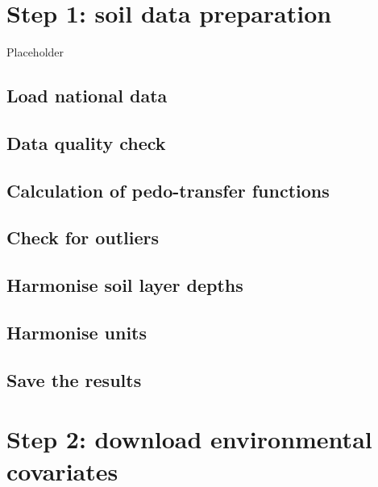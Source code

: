 \documentclass[
  10pt,
  b5paper,
  oneside]{book}
\begin{document}
\hypertarget{step-1-soil-data-preparation}{%
\chapter{Step 1: soil data preparation}\label{step-1-soil-data-preparation}}

Placeholder

\hypertarget{load-national-data}{%
\section{Load national data}\label{load-national-data}}

\hypertarget{data-quality-check}{%
\section{Data quality check}\label{data-quality-check}}

\hypertarget{calculation-of-pedo-transfer-functions}{%
\section{Calculation of pedo-transfer functions}\label{calculation-of-pedo-transfer-functions}}

\hypertarget{check-for-outliers}{%
\section{Check for outliers}\label{check-for-outliers}}

\hypertarget{harmonise-soil-layer-depths}{%
\section{Harmonise soil layer depths}\label{harmonise-soil-layer-depths}}

\hypertarget{harmonise-units}{%
\section{Harmonise units}\label{harmonise-units}}

\hypertarget{save-the-results}{%
\section{Save the results}\label{save-the-results}}

\hypertarget{step-2-download-environmental-covariates}{%
\chapter{Step 2: download environmental covariates}\label{step-2-download-environmental-covariates}}
\end{document}
